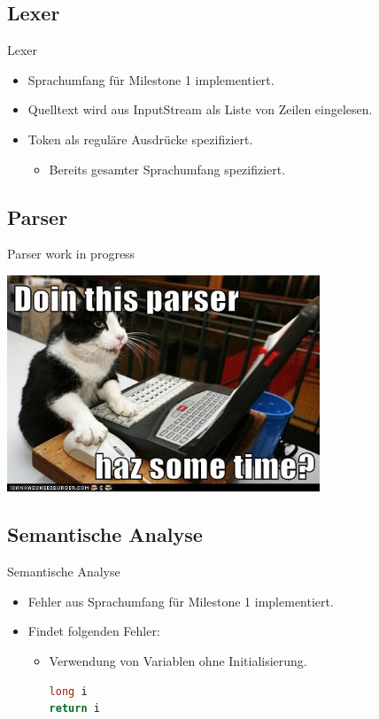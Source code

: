 \documentclass[ucs,10pt]{beamer}
\newlength{\wideitemsep}
\let\olditem\item
\renewcommand{\item}{\setlength{\itemsep}{\wideitemsep}\olditem}
\begin{document}
\subsection{Lexer}
\begin{frame}{Lexer}
	\begin{itemize}
		\item Sprachumfang für Milestone 1 implementiert.
		\item Quelltext wird aus InputStream als Liste von Zeilen eingelesen.
		\item Token als reguläre Ausdrücke spezifiziert.
		\begin{itemize}
			\item Bereits gesamter Sprachumfang spezifiziert.
		\end{itemize}
	\end{itemize}
\end{frame}

\subsection{Parser}
\begin{frame}{Parser}
	work in progress
	
	\pause
	
	\begin{center}
	\includegraphics[width=0.7\textwidth]{parser}
	\end{center}
\end{frame}

\subsection{Semantische Analyse}
\begin{frame}[fragile]{Semantische Analyse}
	\begin{itemize}
		\item Fehler aus Sprachumfang für Milestone 1 implementiert.
		\item Findet folgenden Fehler:
		\begin{itemize}
			\item Verwendung von Variablen ohne Initialisierung.
				\begin{lstlisting}[language=C]
long i
return i
				\end{lstlisting}
		\end{itemize}
	\end{itemize}
	

\end{frame}
\end{document}
